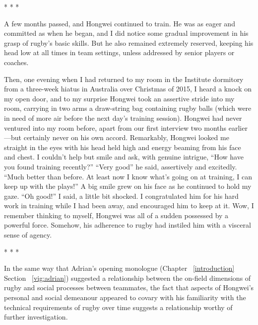 \begin{CJK}{UTF8}{gbsn}
                            \begin{center}
                              * * *
                            \end{center}

A few months passed, and Hongwei continued to train.  He was as eager and committed as when he began, and I did notice some gradual improvement in his grasp of rugby's basic skills.  But he also remained extremely reserved, keeping his head low at all times in team settings, unless addressed by senior players or coaches.

Then, one evening when I had returned to my room in the Institute dormitory from a three-week hiatus in Australia over Christmas of 2015, I heard a knock on my open door, and to my surprise Hongwei took an assertive stride into my room, carrying in two arms a draw-string bag containing rugby balls (which were in need of more air before the next day's training session).  Hongwei had never ventured into my room before, apart from our first interview two months earlier---but certainly never on his own accord.  Remarkably, Hongwei looked me straight in the eyes with his head held high and energy beaming from his face and chest.  I couldn't help but smile and ask, with genuine intrigue, ``How have you found training recently?''
``Very good'' he said, assertively and excitedly.  ``Much better than before.  At least now I know what’s going on at training, I can keep up with the plays!''  A big smile grew on his face as he continued to hold my gaze.  ``Oh good!'' I said, a little bit shocked.  I congratulated him for his hard work in training while I had been away, and encouraged him to keep at it.  Wow, I remember thinking to myself, Hongwei was all of a sudden possessed by a powerful force.  Somehow, his adherence to rugby had instiled him with a visceral sense of agency.

                          \begin{center}
                            * * *
                          \end{center}

In the same way that Adrian's opening monologue (Chapter ~\ref{introduction} Section ~\ref{vig:adrian}) suggested a relationship between the on-field dimensions of rugby and social processes between teammates, the fact that aspects of Hongwei's personal and social demeanour appeared to covary with his familiarity with the technical requirements of rugby over time suggests a relationship worthy of further investigation.


\end{CJK}
